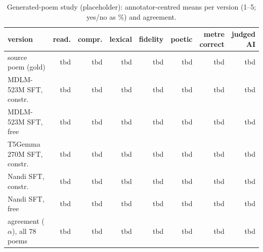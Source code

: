 \documentclass[11pt]{article}
\newcommand{\tbd}{\textcolor{pend}{\textsf{tbd}}}
\begin{document}
\begin{table}[H]
\centering\tiny\setlength{\tabcolsep}{1.5pt}
\begin{tabular}{@{}lrrrrrrr@{}}
\toprule
version & read. & compr. & lexical & fidelity & poetic & \makecell[r]{metre\\correct} & \makecell[r]{judged\\AI} \\
\midrule
source poem (gold) & \tbd & \tbd & \tbd & \tbd & \tbd & \tbd & \tbd \\
MDLM-523M SFT, constr. & \tbd & \tbd & \tbd & \tbd & \tbd & \tbd & \tbd \\
MDLM-523M SFT, free & \tbd & \tbd & \tbd & \tbd & \tbd & \tbd & \tbd \\
T5Gemma 270M SFT, constr. & \tbd & \tbd & \tbd & \tbd & \tbd & \tbd & \tbd \\
Nandi SFT, constr. & \tbd & \tbd & \tbd & \tbd & \tbd & \tbd & \tbd \\
Nandi SFT, free & \tbd & \tbd & \tbd & \tbd & \tbd & \tbd & \tbd \\
\midrule
agreement ($\alpha$), all 78 poems & \tbd & \tbd & \tbd & \tbd & \tbd & \tbd & \tbd \\
\bottomrule
\end{tabular}
\caption{Generated-poem study (placeholder): annotator-centred means per version (1--5; yes/no as \%) and agreement.}
\label{tab:phase2}
\end{table}
\end{document}
